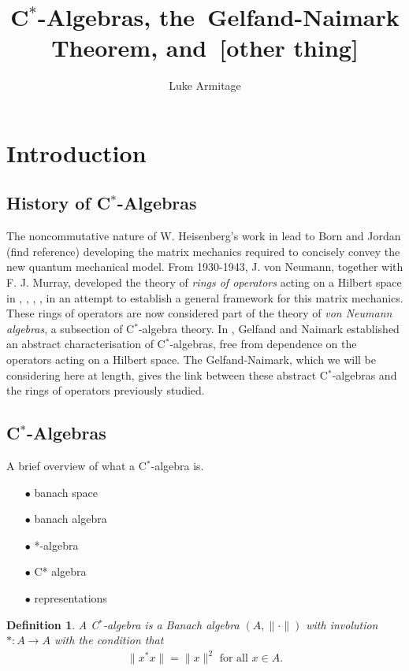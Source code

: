 \documentclass[12pt,a4paper]{amsart}
\author{Luke Armitage}
\title{C$^\ast$-Algebras, the~Gelfand-Naimark Theorem, and~[other thing]}
\theoremstyle{plain}
\theoremstyle{defn}
\newtheorem{defn}{Definition}
\begin{document}
\maketitle
\section{Introduction}
\subsection{History of C$^\ast$-Algebras}
	The noncommutative nature of W. Heisenberg's work in \cite{heisenberg25} lead to Born and Jordan (find reference) developing the matrix mechanics required to concisely convey the new quantum mechanical model. 
	From 1930-1943, J. von Neumann, together with F. J. Murray, developed the theory of \emph{rings of operators} acting on a Hilbert space in \cite{vonneumann35}, \cite{vonneumann37}, \cite{vonneumann40}, \cite{vonneumann43}, in an attempt to establish a general framework for this matrix mechanics.
	These rings of operators are now considered part of the theory of \emph{von Neumann algebras}, a subsection of C$^\ast$-algebra theory.
	In \cite{gelfand43}, Gelfand and Naimark established an abstract characterisation of C$^\ast$-algebras, free from dependence on the operators acting on a Hilbert space.
	The Gelfand-Naimark, which we will be considering here at length, gives the link between these abstract C$^\ast$-algebras and the rings of operators previously studied.
	
	
\subsection{C$^\ast$-Algebras}
	A brief overview of what a C$^\ast$-algebra is.
\begin{enumerate}
	\item[$\bullet$] banach space
	\item[$\bullet$] banach algebra
	\item[$\bullet$] *-algebra
	\item[$\bullet$] C* algebra
	\item[$\bullet$] representations
\end{enumerate}
\begin{defn}
A \emph{C$^\ast$-algebra} is a Banach algebra $(A, \| \cdot \|)$ with involution $\ast : A \to A$ with the condition that
\begin{align*}
	\|x ^\ast x\| = \|x\|^2 \mbox{ for all } x \in A.
\end{align*}
\end{defn}
 
\end{document}

